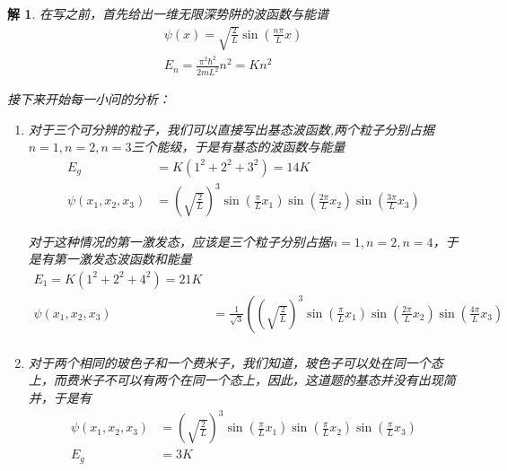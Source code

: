\documentclass{article}
\newtheorem{solution}{解}
\begin{document}
\begin{solution}
    在写之前，首先给出一维无限深势阱的波函数与能谱
    \begin{align*}
        \psi(x)=\sqrt{\frac{2}{L}}\sin(\frac{n\pi}{L}x)\\
        E_n=\frac{\pi^2\hbar^2}{2mL^2}n^2=K n^2
    \end{align*}

    接下来开始每一小问的分析：
    \begin{enumerate}
        \item 对于三个可分辨的粒子，我们可以直接写出基态波函数,两个粒子分别占据$n=1,n=2,n=3$三个能级，于是有基态的波函数与能量
        \begin{align*}
            E_g&=K(1^2+2^2+3^2)=14K\\
            \psi(x_1,x_2,x_3)&=\left(\sqrt{\frac{2}{L}}\right)^3\sin(\frac{\pi}{L}x_1)\sin(\frac{2\pi}{L}x_2)\sin(\frac{3\pi}{L}x_3)
        \end{align*}

        对于这种情况的第一激发态，应该是三个粒子分别占据$n=1,n=2,n=4$，于是有第一激发态波函数和能量
        \begin{align*}
            E_1=K(1^2+2^2+4^2)=21K\\
            \psi(x_1,x_2,x_3)&=\frac{1}{\sqrt{3}}\left(\left(\sqrt{\frac{2}{L}}\right)^3\sin(\frac{\pi}{L}x_1)\sin(\frac{2\pi}{L}x_2)\sin(\frac{4\pi}{L}x_3)\right.\\
        \end{align*}
       
        \item 对于两个相同的玻色子和一个费米子，我们知道，玻色子可以处在同一个态上，而费米子不可以有两个在同一个态上，因此，这道题的基态并没有出现简并，于是有
        \begin{align*}
            \psi(x_1,x_2,x_3)&=\left(\sqrt{\frac{2}{L}}\right)^3\sin(\frac{\pi}{L}x_1)\sin(\frac{\pi}{L}x_2)\sin(\frac{\pi}{L}x_3)\\
            E_g&=3K
        \end{align*}


\end{enumerate}
\end{solution}
\end{document}
